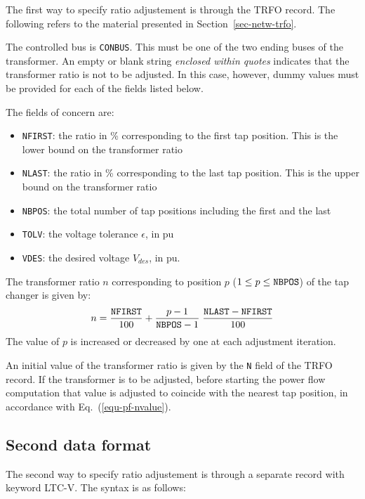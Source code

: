 The first way to specify ratio adjustement is through the TRFO record. The following refers to the material  presented in Section~\ref{sec-netw-trfo}.

The controlled bus is {\tt CONBUS}. This must be one of the two ending buses of the transformer. An empty or blank string {\sl \large enclosed within quotes} indicates that the transformer ratio is not to be adjusted. In this case, however, dummy values must be provided for each of the fields listed below.

The fields of concern are:

\begin{itemize}
\item {\tt NFIRST}: the ratio in \% corresponding to the first tap position. This is the lower bound on the transformer ratio
\item {\tt NLAST}: the ratio in \% corresponding to the last tap position. This is the upper bound on the transformer ratio
\item {\tt NBPOS}: the total number of tap positions including the first and the last
\item {\tt TOLV}: the voltage tolerance $\epsilon$, in pu
\item {\tt VDES}: the desired voltage $V_{des}$, in pu.
\end{itemize}

The transformer ratio $n$ corresponding to position $p$ ($1 \le p \le {\tt NBPOS}$) of the tap changer is given by:
\begin{equation}\label{equ-pf-nvalue}
n = \frac{{\tt NFIRST}}{100} + \frac{p-1}{{\tt NBPOS}-1} \; \frac{{\tt NLAST} - {\tt NFIRST}}{100}
\end{equation}
The value of $p$ is increased or decreased by one at each adjustment iteration.

An initial value of the transformer ratio is given by the {\tt N} field of the TRFO record. If the transformer is to be adjusted, before starting the power flow computation that value is adjusted to coincide with the nearest tap position, in accordance with Eq.~(\ref{equ-pf-nvalue}).

\subsection{Second data format}

The second way to specify ratio adjustement is through a separate record with keyword LTC-V. The syntax is as follows:

\hspace*{5ex}{\tt LTC-V NAME CON\_BUS NFIRST NLAST NBPOS TOLV VDES ;}

